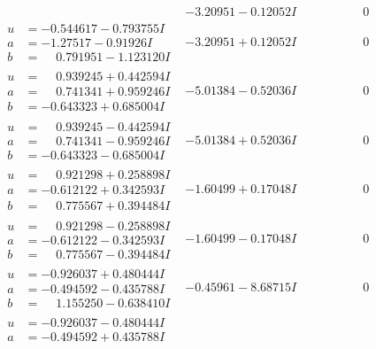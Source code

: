 \documentclass[1p]{elsarticle_modified}
\theoremstyle{definition}
\begin{document}
$$\begin{array}{c|c|c}
 & -3.20951 - 0.12052 I & \phantom{-0.000000 } 0 \\ \hline\begin{aligned}
u &= -0.544617 - 0.793755 I \\
a &= -1.27517 - 0.91926 I \\
b &= \phantom{-}0.791951 - 1.123120 I\end{aligned}
 & -3.20951 + 0.12052 I & \phantom{-0.000000 } 0 \\ \hline\begin{aligned}
u &= \phantom{-}0.939245 + 0.442594 I \\
a &= \phantom{-}0.741341 + 0.959246 I \\
b &= -0.643323 + 0.685004 I\end{aligned}
 & -5.01384 - 0.52036 I & \phantom{-0.000000 } 0 \\ \hline\begin{aligned}
u &= \phantom{-}0.939245 - 0.442594 I \\
a &= \phantom{-}0.741341 - 0.959246 I \\
b &= -0.643323 - 0.685004 I\end{aligned}
 & -5.01384 + 0.52036 I & \phantom{-0.000000 } 0 \\ \hline\begin{aligned}
u &= \phantom{-}0.921298 + 0.258898 I \\
a &= -0.612122 + 0.342593 I \\
b &= \phantom{-}0.775567 + 0.394484 I\end{aligned}
 & -1.60499 + 0.17048 I & \phantom{-0.000000 } 0 \\ \hline\begin{aligned}
u &= \phantom{-}0.921298 - 0.258898 I \\
a &= -0.612122 - 0.342593 I \\
b &= \phantom{-}0.775567 - 0.394484 I\end{aligned}
 & -1.60499 - 0.17048 I & \phantom{-0.000000 } 0 \\ \hline\begin{aligned}
u &= -0.926037 + 0.480444 I \\
a &= -0.494592 - 0.435788 I \\
b &= \phantom{-}1.155250 - 0.638410 I\end{aligned}
 & -0.45961 - 8.68715 I & \phantom{-0.000000 } 0 \\ \hline\begin{aligned}
u &= -0.926037 - 0.480444 I \\
a &= -0.494592 + 0.435788 I \\

\end{aligned}
\end{array}$$
\end{document}
